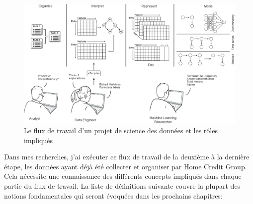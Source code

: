 \begin{figure}
    \centering
    \includegraphics[width=0.75\linewidth]{images/Fig1DFS.png}
    \centering
    \caption{Le flux de travail d'un projet de science des données et les rôles impliqués}
    \label{fig:fig1}
\end{figure}

Dans mes recherches, j'ai exécuter ce flux de travail de la deuxième à la dernière étape, les données ayant déjà été collecter et organiser par Home Credit Group. Cela nécessite une connaissance des différents concepts impliqués dans chaque partie du flux de travail. La liste de définitions suivante couvre la plupart des notions fondamentales qui seront évoquées dans les prochains chapitres:

